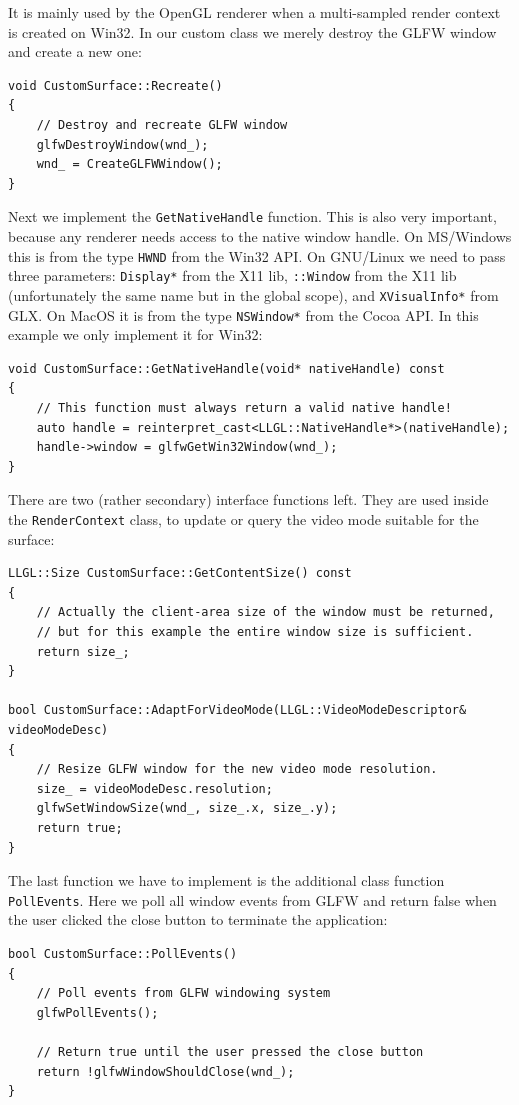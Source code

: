 \documentclass{article}
\begin{document}
It is mainly used by the OpenGL renderer when a multi-sampled render context is created on Win32.
In our custom class we merely destroy the GLFW window and create a new one:
\begin{lstlisting}
void CustomSurface::Recreate()
{
	// Destroy and recreate GLFW window
	glfwDestroyWindow(wnd_);
	wnd_ = CreateGLFWWindow();
}
\end{lstlisting}
Next we implement the \texttt{GetNativeHandle} function. This is also very important,
because any renderer needs access to the native window handle.
On MS/Windows this is from the type \texttt{HWND} from the Win32 API.
On GNU/Linux we need to pass three parameters: \texttt{Display*} from the X11 lib,
\texttt{::Window} from the X11 lib (unfortunately the same name but in the global scope),
and \texttt{XVisualInfo*} from GLX.
On MacOS it is from the type \texttt{NSWindow*} from the Cocoa API.
In this example we only implement it for Win32:
\begin{lstlisting}
void CustomSurface::GetNativeHandle(void* nativeHandle) const
{
	// This function must always return a valid native handle!
	auto handle = reinterpret_cast<LLGL::NativeHandle*>(nativeHandle);
	handle->window = glfwGetWin32Window(wnd_);
}
\end{lstlisting}
There are two (rather secondary) interface functions left.
They are used inside the \texttt{RenderContext} class, to update or query the video mode suitable for the surface:
\begin{lstlisting}
LLGL::Size CustomSurface::GetContentSize() const
{
	// Actually the client-area size of the window must be returned,
	// but for this example the entire window size is sufficient.
	return size_;
}

bool CustomSurface::AdaptForVideoMode(LLGL::VideoModeDescriptor& videoModeDesc)
{
	// Resize GLFW window for the new video mode resolution.
	size_ = videoModeDesc.resolution;
	glfwSetWindowSize(wnd_, size_.x, size_.y);
	return true;
}
\end{lstlisting}
The last function we have to implement is the additional class function \texttt{PollEvents}.
Here we poll all window events from GLFW and return false when the user
clicked the close button to terminate the application:
\begin{lstlisting}
bool CustomSurface::PollEvents()
{
	// Poll events from GLFW windowing system
	glfwPollEvents();
	
	// Return true until the user pressed the close button
	return !glfwWindowShouldClose(wnd_);
}
\end{lstlisting}
\end{document}
